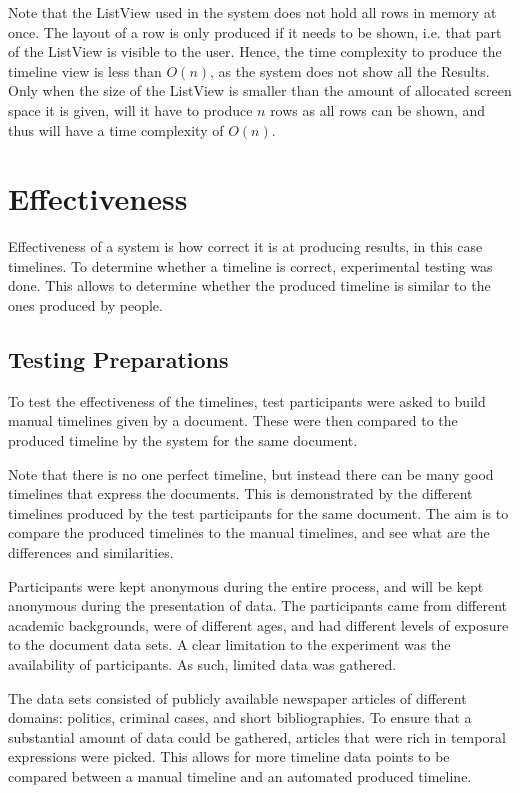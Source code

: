 \par Note that the ListView used in the system does not hold all rows in memory at once. The layout of a row is only produced if it needs to be shown, i.e. that part of the ListView is visible to the user. Hence, the time complexity to produce the timeline view is less than $O(n)$, as the system does not show all the Results. Only when the size of the ListView is smaller than the amount of allocated screen space it is given, will it have to produce $n$ rows as all rows can be shown, and thus will have a time complexity of $O(n)$.

\section{Effectiveness}

\par Effectiveness of a system is how correct it is at producing results, in this case timelines. To determine whether a timeline is correct, experimental testing was done. This allows to determine whether the produced timeline is similar to the ones produced by people.

\subsection{Testing Preparations}
\par To test the effectiveness of the timelines, test participants were asked to build manual timelines given by a document. These were then compared to the produced timeline by the system for the same document.

\par Note that there is no one perfect timeline, but instead there can be many good timelines that express the documents. This is demonstrated by the different timelines produced by the test participants for the same document.  The aim is to compare the produced timelines to the manual timelines, and see what are the differences and similarities.

\par Participants were kept anonymous during the entire process, and will be kept anonymous during the presentation of data. The participants came from different academic backgrounds, were of different ages, and had different levels of exposure to the document data sets. A clear limitation to the experiment was the availability of participants. As such, limited data was gathered.
 
\par The data sets consisted of publicly available newspaper articles of different domains: politics, criminal cases, and short bibliographies. To ensure that a substantial amount of data could be gathered, articles that were rich in temporal expressions were picked. This allows for more timeline data points to be compared between a manual timeline and an automated produced timeline.

